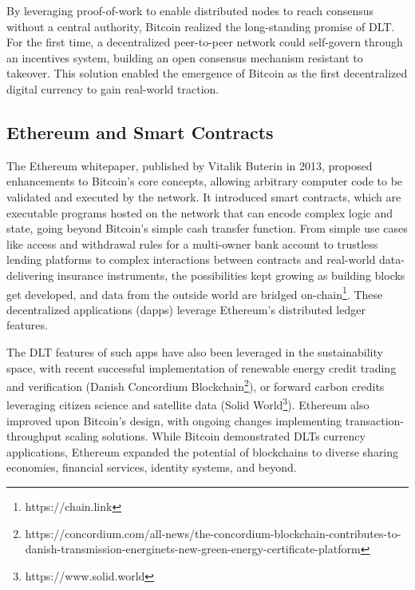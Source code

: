 \documentclass[11pt]{report}
\begin{document}
By leveraging proof-of-work to enable distributed nodes to reach consensus without a central authority, Bitcoin realized the long-standing promise of \ac{DLT}. For the first time, a decentralized peer-to-peer network could self-govern through an incentives system, building an open consensus mechanism resistant to takeover. This solution enabled the emergence of Bitcoin as the first decentralized digital currency to gain real-world traction.

\subsection{Ethereum and Smart Contracts}

The Ethereum whitepaper\cite{buterinEthereumNextgenerationSmart}, published by Vitalik Buterin in 2013, proposed enhancements to Bitcoin's core concepts, allowing arbitrary computer code to be validated and executed by the network. It introduced smart contracts, which are executable programs hosted on the network that can encode complex logic and state, going beyond Bitcoin's simple cash transfer function. From simple use cases like access and withdrawal rules for a multi-owner bank account to trustless lending platforms to complex interactions between contracts and real-world data-delivering insurance instruments, the possibilities kept growing as building blocks get developed, and data from the outside world are bridged on-chain\footnote{https://chain.link}. These decentralized applications (dapps) leverage Ethereum's distributed ledger features.

The \ac{DLT} features of such apps have also been leveraged in the sustainability space, with recent successful implementation of renewable energy credit trading and verification (Danish Concordium Blockchain\footnote{https://concordium.com/all-news/the-concordium-blockchain-contributes-to-danish-transmission-energinets-new-green-energy-certificate-platform}), or forward carbon credits leveraging citizen science and satellite data (Solid World\footnote{https://www.solid.world}). Ethereum also improved upon Bitcoin's design, with ongoing changes implementing transaction-throughput scaling solutions. While Bitcoin demonstrated \ac{DLT}s currency applications, Ethereum expanded the potential of blockchains to diverse sharing economies, financial services, identity systems, and beyond.
\end{document}

